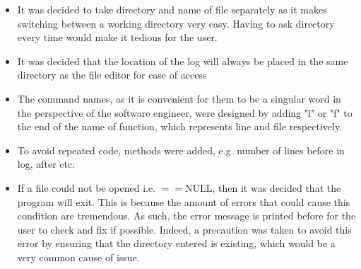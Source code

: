 \documentclass[a4paper]{article}
\theoremstyle{plain}
\theoremstyle{definition}
\theoremstyle{remark}
\begin{document}
\begin{itemize}
\begin{lstlisting}[language = C , caption={Help message trigger and command} , frame = trBL , firstnumber = last , escapeinside={(*@}{@*)}]
		// Help command that prints existing commands

		if (strcmp(command, "help") == 0) {
			printf("=============FILE SELECTION=============\n");
			printf("Change parent directory:\n");
			printf("dirf\n");
			printf("Change file:\n");
			printf("namef\n");
			printf("=============FILE MANAGEMENT=============\n");
			printf("Delete selected file:\n");
			printf("deletef\n");
			printf("Read selected file:\n");
			printf("readf\n");
			printf("Copy selected file:\n");
			printf("copyf\n");
			printf("Create file:\n");
			printf("createf\n");
			printf("=============LINE MANAGEMENT=============\n");
			printf("Number of lines in file:\n");
			printf("linef\n");
			printf("Append a line:\n");
			printf("appendl\n");
			printf("Insert a line:\n");
			printf("insertl\n");
			printf("Show a line:\n");
			printf("showl\n");
			printf("Delete a line:\n");
			printf("deletel\n");
			printf("Copy a line:\n");
			printf("copyl\n");
			printf("Paste copied line: \n");
			printf("pastel\n");
			printf("=============OTHER=============\n");
			printf("Exit the program:\n");
			printf("exit\n");
			printf("View writing log:\n");
			printf("log\n");
			}
		...
	\end{lstlisting}
	\item It was decided to take directory and name of file separately as it makes switching between a working directory very easy. Having to ask directory every time would make it tedious for the user.
	\item It was decided that the location of the log will always be placed in the same directory as the file editor for ease of access
	\item The command names, as it is convenient for them to be a singular word in the perspective of the software engineer, were designed by adding "l" or "f" to the end of the name of function, which represents line and file respectively.
	\item To avoid repeated code, methods were added, e.g. number of lines before in log, after etc.
	\item If a file could not be opened i.e. $==\text{NULL}$, then it was decided that the program will exit. This is because the amount of errors that could cause this condition are tremendous. As such, the error message is printed before for the user to check and fix if possible. Indeed, a precaution was taken to avoid this error by ensuring that the directory entered is existing, which would be a very common cause of issue.
\end{itemize}
\end{document}
